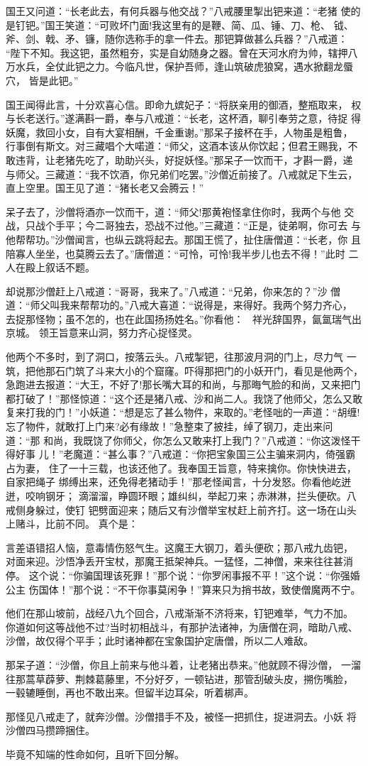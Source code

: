 国王又问道：“长老此去，有何兵器与他交战？”八戒腰里掣出钯来道：“老猪
使的是钉钯。”国王笑道：“可败坏门面!我这里有的是鞭、简、瓜、锤、刀、枪、
钺、斧、剑、戟、矛、镰，随你选称手的拿一件去。那钯算做甚么兵器？”八戒道：
“陛下不知。我这钯，虽然粗夯，实是自幼随身之器。曾在天河水府为帅，辖押八
万水兵，全仗此钯之力。今临凡世，保护吾师，逢山筑破虎狼窝，遇水掀翻龙蜃穴，
皆是此钯。”

国王闻得此言，十分欢喜心信。即命九嫔妃子：“将朕亲用的御酒，整瓶取来，
权与长老送行。”遂满斟一爵，奉与八戒道：“长老，这杯酒，聊引奉劳之意，待捉
得妖魔，救回小女，自有大宴相酬，千金重谢。”那呆子接杯在手，人物虽是粗鲁，
行事倒有斯文。对三藏唱个大喏道：“师父，这酒本该从你饮起；但君王赐我，不
敢违背，让老猪先吃了，助助兴头，好捉妖怪。”那呆子一饮而干，才斟一爵，递
与师父。三藏道：“我不饮酒，你兄弟们吃罢。”沙僧近前接了。八戒就足下生云，
直上空里。国王见了道：“猪长老又会腾云！”

呆子去了，沙僧将酒亦一饮而干，道：“师父!那黄袍怪拿住你时，我两个与他
交战，只战个手平；今二哥独去，恐战不过他。”三藏道：“正是，徒弟啊，你可去
与他帮帮功。”沙僧闻言，也纵云跳将起去。那国王慌了，扯住唐僧道：“长老，你
且陪寡人坐坐，也莫腾云去了。”唐僧道：“可怜，可怜!我半步儿也去不得！”此时
二人在殿上叙话不题。

却说那沙僧赶上八戒道：“哥哥，我来了。”八戒道：“兄弟，你来怎的？”沙
僧道：“师父叫我来帮帮功的。”八戒大喜道：“说得是，来得好。我两个努力齐心，
去捉那怪物；虽不怎的，也在此国扬扬姓名。”你看他：
祥光辞国界，氤氲瑞气出京城。
领王旨意来山洞，努力齐心捉怪灵。

他两个不多时，到了洞口，按落云头。八戒掣钯，往那波月洞的门上，尽力气
一筑，把他那石门筑了斗来大小的个窟窿。吓得那把门的小妖开门，看见是他两个，
急跑进去报道：“大王，不好了!那长嘴大耳的和尚，与那晦气脸的和尚，又来把门
都打破了！”那怪惊道：“这个还是猪八戒、沙和尚二人。我饶了他师父，怎么又敢
复来打我的门！”小妖道：“想是忘了甚么物件，来取的。”老怪咄的一声道：“胡缠!
忘了物件，就敢打上门来?必有缘故！”急整束了披挂，绰了钢刀，走出来问道：“那
和尚，我既饶了你师父，你怎么又敢来打上我门？”八戒道：“你这泼怪干得好事
儿！”老魔道：“甚么事？”八戒道：“你把宝象国三公主骗来洞内，倚强霸占为妻，
住了一十三载，也该还他了。我奉国王旨意，特来擒你。你快快进去，自家把绳子
绑缚出来，还免得老猪动手！”那老怪闻言，十分发怒。你看他屹迸迸，咬响钢牙；
滴溜溜，睁圆环眼；雄纠纠，举起刀来；赤淋淋，拦头便砍。八戒侧身躲过，使钉
钯劈面迎来；随后又有沙僧举宝杖赶上前齐打。这一场在山头上赌斗，比前不同。
真个是：

言差语错招人恼，意毒情伤怒气生。这魔王大钢刀，着头便砍；那八戒九齿钯，
对面来迎。沙悟净丢开宝杖，那魔王抵架神兵。一猛怪，二神僧，来来往往甚消停。
这个说：“你骗国理该死罪！”那个说：“你罗闲事报不平！”这个说：“你强婚公主
伤国体！”那个说：“不干你事莫闲争！”算来只为捎书故，致使僧魔两不宁。

他们在那山坡前，战经八九个回合，八戒渐渐不济将来，钉钯难举，气力不加。
你道如何这等战他不过?当时初相战斗，有那护法诸神，为唐僧在洞，暗助八戒、
沙僧，故仅得个平手；此时诸神都在宝象国护定唐僧，所以二人难敌。

那呆子道：“沙僧，你且上前来与他斗着，让老猪出恭来。”他就顾不得沙僧，
一溜往那蒿草薜萝、荆棘葛藤里，不分好歹，一顿钻进，那管刮破头皮，搠伤嘴脸，
一毂辘睡倒，再也不敢出来。但留半边耳朵，听着梆声。

那怪见八戒走了，就奔沙僧。沙僧措手不及，被怪一把抓住，捉进洞去。小妖
将沙僧四马攒蹄捆住。

毕竟不知端的性命如何，且听下回分解。